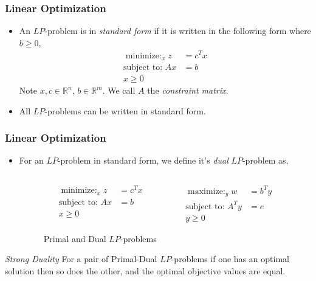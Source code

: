 \documentclass{beamer}
\newcommand{\RR}{\mathbb{R}}
\begin{document}
\begin{frame}
	\frametitle{Linear Optimization}
	\begin{itemize}
		\item An $LP$-problem is in \emph{standard form} if it is written in the following form where $b \geq 0$,
		\begin{align*}
			\mathop{\text{minimize: }}_{x}  z &= c^Tx\\
			\text{subject to: }Ax &= b\\
			x \geq 0
		\end{align*}  
		Note $x, c \in \RR^n$, $b \in \RR^m$. We call $A$ the \emph{constraint matrix}.

		\item All $LP$-problems can be written in standard form. 
	\end{itemize}
	\end{frame}



	\begin{frame}
		\frametitle{Linear Optimization}
		\begin{itemize}
			\item For an $LP$-problem in standard form, we define it's \emph{dual} $LP$-problem as, 
			\begin{figure}
				\caption{Primal and Dual $LP$-problems}
				\begin{columns}
					\begin{column}{.5\textwidth}
						\begin{center}
							\begin{align*}
								\mathop{\text{minimize: }}_{x}  z &= c^Tx\\
								\text{subject to: }Ax &= b\\
								x \geq 0
							\end{align*}  
						\end{center}
					\end{column}
					\begin{column}{.5\textwidth}
						\begin{center}
							\begin{align*}
								\mathop{\text{maximize: }}_{y}  w &= b^Ty\\
								\text{subject to: }A^Ty &= c\\
								y\geq 0
							\end{align*} 
						\end{center}
					\end{column}
				\end{columns}
			\end{figure}
		\end{itemize}
		\begin{block}{\emph{Strong Duality}}
		 For a pair of Primal-Dual $LP$-problems if one has an optimal solution then so does the other, and the optimal objective values are equal.
		\end{block}
	\end{frame}
\end{document}
